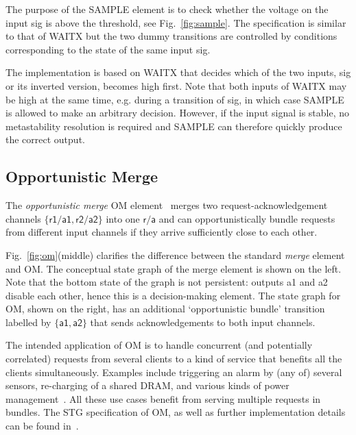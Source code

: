 \documentclass[conference]{IEEEtran}
\begin{document}
The purpose of the \textsf{SAMPLE} element is to check whether the voltage on the input
\textsf{sig} is above the threshold, see Fig.~\ref{fig:sample}. The specification is similar
to that of \textsf{WAITX} but the two dummy transitions are controlled by conditions
corresponding to the state of the same input \textsf{sig}.

The implementation is based on \textsf{WAITX} that decides which of the two inputs,
\textsf{sig} or its inverted version, becomes high first. Note that both inputs of
\textsf{WAITX} may be high at the same time, e.g. during a transition of
\textsf{sig}, in which case \textsf{SAMPLE} is allowed to make an arbitrary decision.
However, if the input signal is stable, no metastability resolution is required and
\textsf{SAMPLE} can therefore quickly produce the correct output.

\subsection*{Opportunistic Merge}

The \emph{opportunistic merge} \textsf{OM} element~\cite{2015_mokhov_om} merges two
request-acknowledgement channels $\{\textsf{r1}/\textsf{a1}, \textsf{r2}/\textsf{a2}\}$
into one $\textsf{r}/\textsf{a}$ and can opportunistically bundle requests from different
input channels if they arrive sufficiently close to each other.

Fig.~\ref{fig:om}(middle) clarifies the difference between the standard \emph{merge}
element~\cite{1999_greenstreet_merge} and \textsf{OM}. The conceptual state graph of
the merge element is shown on the left. Note that the bottom state of the graph is not
persistent: outputs \textsf{a1} and \textsf{a2} disable each other, hence this is a
decision-making element. The state graph for \textsf{OM}, shown on the right, has an additional
`opportunistic bundle' transition labelled by $\{\textsf{a1},\textsf{a2}\}$ that sends
acknowledgements to both input channels.

The intended application of \textsf{OM} is to handle concurrent (and potentially correlated) requests
from several clients to a kind of service that benefits all the clients simultaneously. Examples
include triggering an alarm by (any of) several sensors, re-charging of a shared DRAM, and
various kinds of power management~\cite{2017_sokolov_a4a}. All these use cases benefit from
serving multiple requests in bundles. The STG specification of
\textsf{OM}, as well as further implementation details can be found in~\cite{2015_mokhov_om}.
\end{document}
